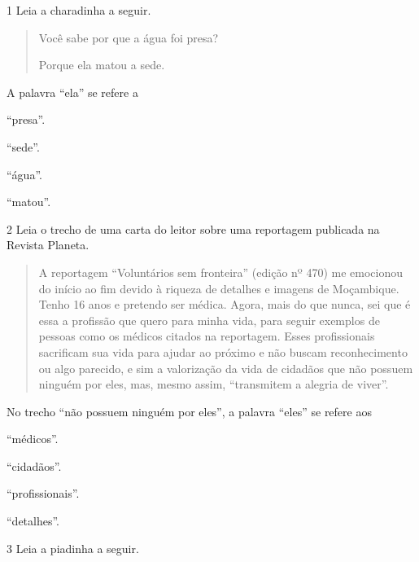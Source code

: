 \begin{conteudo}
\begin{conteudo}
\begin{conteudo}
\begin{conteudo}
\num{1} Leia a charadinha a seguir.

\begin{quote}
Você sabe por que a água foi presa?

Porque ela matou a sede.
\end{quote}

A palavra ``ela'' se refere a

\begin{escolha}
\item ``presa''.

\item ``sede''.

\item ``água''.

\item ``matou''.
\end{escolha}

\num{2} Leia o trecho de uma carta do leitor sobre uma reportagem
publicada na Revista Planeta.

\begin{quote}
A reportagem ``Voluntários sem fronteira'' (edição nº 470) me emocionou
do início ao fim devido à riqueza de detalhes e imagens de Moçambique.
Tenho 16 anos e pretendo ser médica. Agora, mais do que nunca, sei que é
essa a profissão que quero para minha vida, para seguir exemplos de
pessoas como os médicos citados na reportagem. Esses profissionais
sacrificam sua vida para ajudar ao próximo e não buscam reconhecimento
ou algo parecido, e sim a valorização da vida de cidadãos que não
possuem ninguém por eles, mas, mesmo assim, ``transmitem a alegria de
viver''.

\end{quote}

\pagebreak
No trecho ``não possuem ninguém por eles'', a palavra ``eles'' se refere
aos

\begin{escolha}
\item ``médicos''.

\item ``cidadãos''.

\item ``profissionais''.

\item ``detalhes''.
\end{escolha}


\num{3} Leia a piadinha a seguir.


\end{conteudo}
\end{conteudo}
\end{conteudo}
\end{conteudo}
